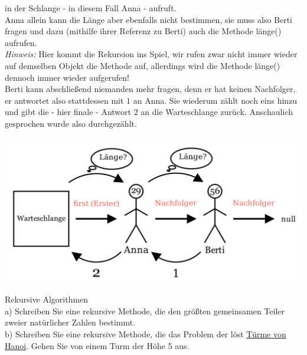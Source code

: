 \documentclass{article}
\begin{document}
in der Schlange - in diesem Fall Anna - aufruft. \\
Anna allein kann die Länge aber ebenfalls nicht bestimmen, sie muss also Berti fragen und dazu 
(mithilfe ihrer Referenz zu Berti) auch die Methode länge() aufrufen. \\
\textit{Hinweis:} Hier kommt die Rekursion ins Spiel, wir rufen zwar nicht immer wieder auf 
demselben Objekt die Methode auf, allerdings wird die Methode länge() dennoch immer wieder 
aufgerufen! \\
Berti kann abschließend niemanden mehr fragen, denn er hat keinen Nachfolger, er antwortet 
also stattdessen mit $1$ an Anna. Sie wiederum zählt noch eins hinzu und gibt die - hier finale - 
Antwort $2$ an die Warteschlange zurück. Anschaulich gesprochen wurde also  durchgezählt. 
\begin{center}
    \includegraphics[scale = 0.20]{../media/linked_list_length2.png}
\end{center}



\begin{task}{Rekursive Algorithmen}
    \\
    a) Schreiben Sie eine rekursive Methode, die den größten gemeinsamen Teiler zweier natürlicher Zahlen bestimmt. \\
    b) Schreiben Sie eine rekursive Methode, die das Problem der  löst \href{https://www.mathematik.ch/spiele/hanoi_mit_grafik/}{Türme von Hanoi}. Gehen Sie von einem Turm der Höhe 5 aus. 
\end{task}
\end{document}
